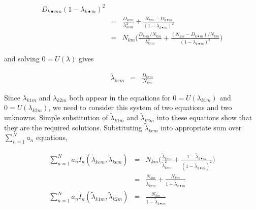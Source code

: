 \documentclass[11pt]{article}
\begin{document}
\begin{eqnarray}
{                                    D_{k\bullet mn}  }{
                                    (1-\lambda_{k\bullet m})^2 } \\
                & = & 
                                   \frac{ D_{kem}}{ \lambda_{kem}^2 } 
                                   + \frac{  N_{km} - D_{k \bullet m}  }{  (1-\lambda_{k\bullet m})^2 }
                                   \\
                & = & 
                                   N_{km}\Biggl(\frac{ D_{kem}/N_{km} }{ \lambda_{kem}^2 } 
                                   + \frac{  (N_{km} - D_{k \bullet m})/N_{km}  }{  (1-\lambda_{k\bullet m})^2 }
                                   \Biggr) 
\end{eqnarray}

and solving $0 = U(\lambda)$ gives 

\begin{eqnarray}
\tilde{\lambda}_{kem} & = & \frac{D_{kem}}{N_{km}}
\end{eqnarray}

Since $\lambda_{k1m}$ and $\lambda_{k2m}$ both appear in the equations
for $0 = U(\lambda_{k1m})$ and $0 = U(\lambda_{k2m})$, we need to consider
this system of two equations and two unknowns.  Simple substitution of
$\tilde{\lambda}_{k1m}$ and $\tilde{\lambda}_{k2m}$ into these
equations show that they are the required solutions. Substituting
$\tilde{\lambda}_{kem}$ into appropriate sum over $\sum_{n=1}^N a_n$
equations,

\begin{eqnarray}
\sum_{n=1}^N a_n I_n(\tilde{\lambda}_{kem},\tilde{\lambda}_{kem})  & = & 
                                      N_{km}\Biggl(\frac{
                                        \tilde{\lambda}_{kem} }
                                      { \tilde{\lambda}_{kem}^2 } 
                                      + \frac{  1- \tilde{\lambda}_{k
                                          \bullet m}  }
                                      {  (1-\tilde{\lambda}_{k\bullet m})^2 }
                                      \Biggr) \\
                  & = &  \frac{ N_{km} }{ \tilde{\lambda}_{kem} } 
                                      + \frac{  N_{km}  }{  1-\tilde{\lambda}_{k\bullet m} } \label{eq:NAkmdiag}
                                      \\
\sum_{n=1}^N a_n I_n(\tilde{\lambda}_{k1m},\tilde{\lambda}_{k2m})  
& = &  
                                     \frac{  N_{km}  }{
                                       1-\tilde{\lambda}_{k\bullet m}
                                     }  \label{eq:NAkmoffdiag}  
\end{eqnarray}
\end{document}
